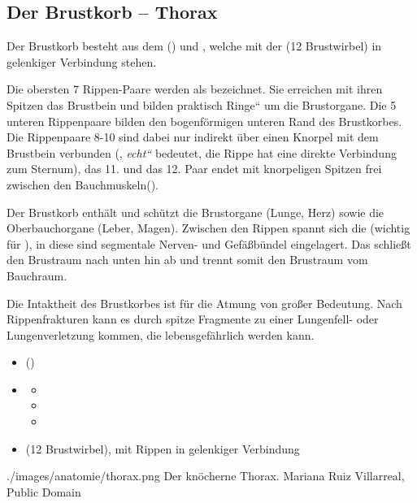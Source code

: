 \subsection{Der Brustkorb -- Thorax}



{
Der  Brustkorb besteht  aus dem 
 () und , welche  mit der  (12
Brust\-wirbel) in gelenkiger Verbindung stehen.

Die obersten 7 Rippen-Paare werden als 
{\quotedblbase}
bezeichnet. Sie erreichen mit ihren Spitzen das Brustbein und bilden praktisch
{\quotedblbase}Ringe{\textquotedblleft} um die Brustorgane. Die 5
unteren Rippenpaare bilden den bogenförmigen unteren Rand des
Brustkorbes. Die Rippenpaare 8-10 sind dabei nur indirekt
über einen Knorpel mit dem Brustbein verbunden
({\quotedblbase},
\emph{{\quotedblbase}echt{\textquotedblleft}} bedeutet, die Rippe hat eine
direkte Verbindung zum Sternum), das 11. und das 12. Paar endet mit knorpeligen Spitzen frei zwischen den
Bauchmuskeln({\quotedblbase}).

Der Brustkorb enthält und schützt die Brust\-organe (Lunge, Herz)
sowie die Oberbauchorgane (Leber, Magen). Zwischen den
Rippen spannt sich die
 (wichtig für ), in diese sind segmentale
Nerven- und Gefäßbündel eingelagert. Das 
 schließt den Brustraum nach unten hin ab
und trennt somit den Brustraum vom Bauchraum.

Die Intaktheit des Brustkorbes ist für die Atmung von großer Bedeutung. Nach
Rippenfrakturen kann es durch spitze Fragmente zu einer
Lungenfell- oder Lungenverletzung kommen, die lebensgefährlich werden kann.




}
{
% 
\begin{itemize}
    \item {} ()
    \item {}
    \begin{itemize}
        \item {}
        \item {}
        \item {}
    \end{itemize}
    \item {} (12 Brust\-wirbel), mit Rippen in gelenkiger Verbindung
\end{itemize}
}
{./images/anatomie/thorax.png}
{Der knöcherne Thorax.}
{Mariana Ruiz Villarreal, Public Domain}



